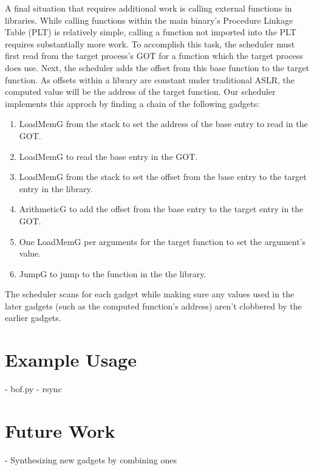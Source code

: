 \documentclass[journal]{IEEEtran}
\begin{document}
A final situation that requires additional work is calling external functions in libraries.
While calling functions within the main binary's Procedure Linkage Table (PLT) is relatively simple, calling a function not imported into the PLT requires substantially more work.
To accomplish this task, the scheduler must first read from the target process's GOT for a function which the target process does use.
Next, the scheduler adds the offset from this base function to the target function.
As offsets within a library are constant under traditional ASLR, the computed value will be the address of the target function.
Our scheduler implements this approch by finding a chain of the following gadgets:
\begin{enumerate}
  \item LoadMemG from the stack to set the address of the base entry to read in the GOT.
  \item LoadMemG to read the base entry in the GOT.
  \item LoadMemG from the stack to set the offset from the base entry to the target entry in the library.
  \item ArithmeticG to add the offset from the base entry to the target entry in the GOT.
  \item One LoadMemG per arguments for the target function to set the argument's value.
  \item JumpG to jump to the function in the the library.
\end{enumerate}
The scheduler scans for each gadget while making sure any values used in the later gadgets (such as the computed function's address) aren't clobbered by the earlier gadgets.

\section{Example Usage}\label{examples}
  - bof.py
  - rsync

\section{Future Work}
  - Synthesizing new gadgets by combining ones


{}
\end{document}
